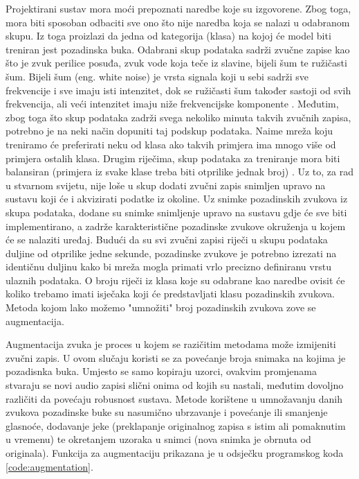 Projektirani sustav mora moći prepoznati naredbe koje su izgovorene.
Zbog toga, mora biti sposoban odbaciti sve ono što nije naredba koja se
nalazi u odabranom skupu. Iz toga proizlazi da jedna od kategorija (klasa)
na kojoj će model biti treniran jest pozadinska buka. Odabrani skup podataka
sadrži zvučne zapise kao što je zvuk perilice posuđa, zvuk vode koja teče
iz slavine, bijeli šum te ružičasti šum. Bijeli šum (eng. white noise) je vrsta
signala koji u sebi sadrži sve frekvencije i sve imaju isti intenzitet,
dok se ružičasti šum također sastoji od svih frekvencija, ali veći intenzitet
imaju niže frekvencijske komponente \cite{noise}. Međutim, zbog toga što skup
podataka zadrži
svega nekoliko minuta takvih zvučnih zapisa, potrebno je na neki način dopuniti
taj podskup podataka. Naime mreža koju treniramo će preferirati neku od klasa
ako takvih primjera ima mnogo više od primjera ostalih klasa. Drugim riječima,
skup podataka za treniranje mora biti balansiran (primjera iz svake klase treba
biti otprilike jednak broj) \cite{balance}. Uz to, za rad u stvarnom svijetu, nije loše u skup
dodati zvučni zapis snimljen upravo na sustavu koji će i akvizirati podatke iz okoline.
Uz snimke pozadinskih zvukova iz skupa podataka, dodane su snimke snimljenje upravo
na sustavu gdje će sve biti implementirano, a zadrže karakteristične pozadinske
zvukove okruženja u kojem će se nalaziti uređaj. Budući da su svi zvučni zapisi 
riječi u skupu podataka duljine od otprilike jedne sekunde, pozadinske zvukove
je potrebno izrezati na identičnu duljinu kako bi mreža mogla primati vrlo 
precizno definiranu vrstu ulaznih podataka. O broju riječi iz klasa koje su odabrane 
kao naredbe ovisit će koliko trebamo imati isječaka koji će predstavljati
klasu pozadinskih zvukova. Metoda kojom lako možemo "umnožiti" broj pozadinskih 
zvukova zove se augmentacija.

Augmentacija zvuka je proces u kojem se razičitim metodama može izmijeniti 
zvučni zapis. U ovom slučaju koristi se za povećanje broja snimaka na kojima
je pozadisnka buka. Umjesto se samo kopiraju uzorci, ovakvim promjenama stvaraju
se novi audio zapisi slični onima od kojih su nastali, međutim dovoljno različiti 
da povećaju robusnost sustava. Metode korištene u umnožavanju danih zvukova
pozadinske buke su nasumično ubrzavanje i povećanje ili smanjenje glasnoće,
dodavanje jeke (preklapanje originalnog zapisa s istim ali pomaknutim u vremenu)
te okretanjem uzoraka u snimci (nova snimka je obrnuta od originala). Funkcija
za augmentaciju prikazana je u odsječku programskog koda \ref{code:augmentation}.

